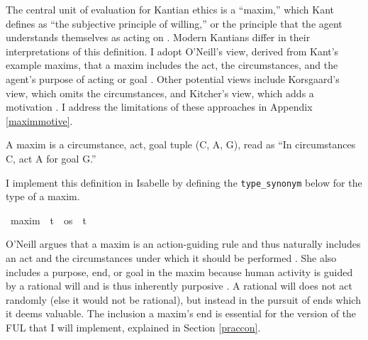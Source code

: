 \begin{isabellebody}
\begin{isamarkuptext}
The central unit of evaluation for Kantian ethics is a ``maxim,'' which Kant defines as ``the subjective 
principle of willing,'' or the principle that the agent understands themselves as acting on \citep{groundwork}. 
Modern Kantians differ in their interpretations of this definition. I adopt O'Neill's view, derived from 
Kant's example maxims, that a maxim includes the act, the circumstances, and the agent's purpose of 
acting or goal \citep{actingonprinciple}. Other potential views include Korsgaard's view, which omits 
the circumstances, and Kitcher's view, which adds a motivation \citep{actingforareason, kitcher}. I 
address the limitations of these approaches in Appendix \ref{maximmotive}.


\begin{definition}[Maxim]
    A maxim is a circumstance, act, goal tuple (C, A, G), read as ``In circumstances C, act A for goal G.''
\end{definition}

I implement this definition in Isabelle by defining the \texttt{type\_synonym} below for the type
of a maxim.%
\end{isamarkuptext}\isamarkuptrue%
\isamarkupfalse%
\ maxim\ {\isacharequal}\ {\isachardoublequoteopen}{\isacharparenleft}t\ {\isacharasterisk}\ os\ {\isacharasterisk}\ t{\isacharparenright}{\isachardoublequoteclose}\isanewline
%
%
\begin{isamarkuptext}%
O'Neill argues that a maxim 
is an action-guiding rule and thus naturally includes an act and the circumstances under which 
it should be performed \citep[37]{actingonprinciple}. 
She also includes a purpose, end, or goal in the maxim because human activity is guided by a rational will
and is thus inherently purposive \citep[4:428]{groundwork}. A rational will does not act randomly (else it would not be rational), 
but instead in the pursuit of ends which it deems valuable. The inclusion a maxim's end is essential 
for the version of the FUL that I will implement, explained in Section \ref{praccon}.


\end{isamarkuptext}
\end{isabellebody}
